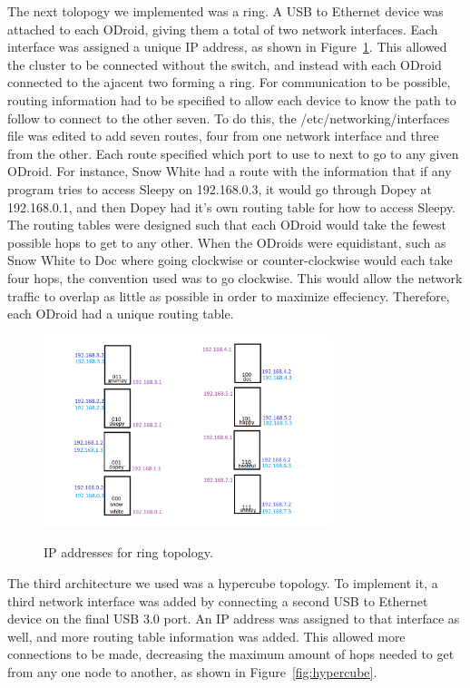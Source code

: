 The next tolopogy we implemented was a ring. A USB to Ethernet device was attached to each ODroid, giving them a total of two network interfaces. Each interface was assigned a unique IP address, as shown in Figure~\ref{fig:ipaddresses}. This allowed the cluster to be connected without the switch, and instead with each ODroid connected to the ajacent two forming a ring. For communication to be possible, routing information had to be specified to allow each device to know the path to follow to connect to the other seven. To do this, the /etc/networking/interfaces file was edited to add seven routes, four from one network interface and three from the other. Each route specified which port to use to next to go to any given ODroid. For instance, Snow White had a route with the information that if any program tries to access Sleepy on 192.168.0.3, it would go through Dopey at 192.168.0.1, and then Dopey had it's own routing table for how to access Sleepy. \\

The routing tables were designed such that each ODroid would take the fewest possible hops to get to any other. When the ODroids were equidistant, such as Snow White to Doc where going clockwise or counter-clockwise would each take four hops, the convention used was to go clockwise. This would allow the network traffic to overlap as little as possible in order to maximize effeciency. Therefore, each ODroid had a unique routing table. \\

\begin{figure}[tbh]
	\caption{IP addresses for ring topology.}
	\centering
		\includegraphics[width=0.75\textwidth]{cluster_ipaddresses.png}
	\label{fig:ipaddresses}
\end{figure}

The third architecture we used was a hypercube topology. To implement it, a third network interface was added by connecting a second USB to Ethernet device on the final USB 3.0 port. An IP address was assigned to that interface as well, and more routing table information was added. This allowed more connections to be made, decreasing the maximum amount of hops needed to get from any one node to another, as shown in Figure~\ref{fig:hypercube}. 

